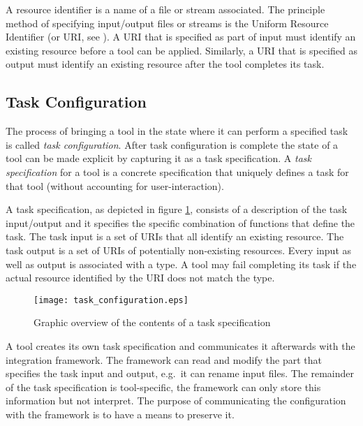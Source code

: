 \documentclass{article}
\begin{document}
   A resource identifier is a name of a file or stream associated.  The principle method of
   specifying input/output files or streams is the Uniform Resource Identifier
   (or URI, see \cite{rfc3305}). A URI that is specified as part of input must
   identify an existing resource before a tool can be applied. Similarly, a URI
   that is specified as output must identify an existing resource after the
   tool completes its task.

  \subsection{Task Configuration} \label{concepts::task_configuration}


   The process of bringing a tool in the state where it can perform a specified
   task is called \textit{task configuration}. After task configuration is
   complete the state of a tool can be made explicit by capturing it as a task
   specification.  A \textit{task specification} for a tool is a concrete
   specification that uniquely defines a task for that tool (without accounting
   for user-interaction).

   A task specification, as depicted in figure \ref{figure:task_specification},
   consists of a description of the task input/output and it specifies the
   specific combination of functions that define the task. The task input is a
   set of URIs that all identify an existing resource. The task output is a set
   of URIs of potentially non-existing resources. Every input as well as output
   is associated with a type. A tool may fail completing its task if the actual
   resource identified by the URI does not match the type.

   \begin{figure}[H]
    \begin{center}
     \texttt{[image: task\_configuration.eps]}
    \end{center}
    \caption{Graphic overview of the contents of a task specification}
    \label{figure:task_specification}
    \vspace{-0.4cm}
   \end{figure}


   A tool creates its own task specification and communicates it afterwards
   with the integration framework. The framework can read and modify the part
   that specifies the task input and output, e.g.\ it can rename input files.
   The remainder of the task specification is tool-specific, the framework can
   only store this information but not interpret. The purpose of communicating
   the configuration with the framework is to have a means to preserve it.
\end{document}
